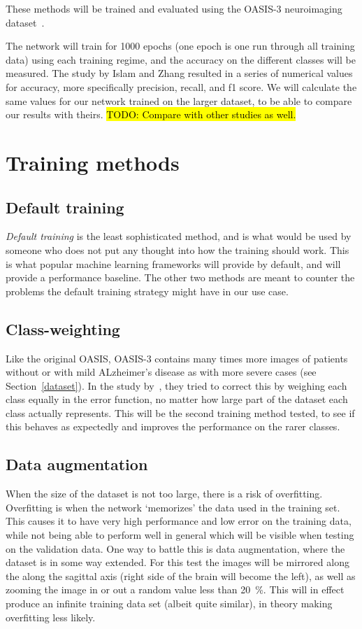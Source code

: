 \documentclass{kththesis}
\newcommand{\num}[1]{{#1}}
\begin{document}
These methods will be trained and evaluated using the OASIS-3 neuroimaging dataset~\cite{oasis}.

The network will train for \num{1000} epochs (one epoch is one run through all training data) using each training regime, and the accuracy on the different classes will be measured. The study by Islam and Zhang resulted in a series of numerical values for accuracy, more specifically precision, recall, and f1 score. We will calculate the same values for our network trained on the larger dataset, to be able to compare our results with theirs. \hl{TODO: Compare with other studies as well.}

\section{Training methods}
\subsection{Default training}
\textit{Default training} is the least sophisticated method, and is what would be used by someone who does not put any thought into how the training should work. This is what popular machine learning frameworks will provide by default, and will provide a performance baseline. The other two methods are meant to counter the problems the default training strategy might have in our use case.

\subsection{Class-weighting}
Like the original OASIS, OASIS-3 contains many times more images of patients without or with mild ALzheimer's disease as with more severe cases (see Section~\ref{dataset}). In the study by~\textcite{islam2017novel}, they tried to correct this by weighing each class equally in the error function, no matter how large part of the dataset each class actually represents. This will be the second training method tested, to see if this behaves as expectedly and improves the performance on the rarer classes.

\subsection{Data augmentation}
When the size of the dataset is not too large, there is a risk of overfitting. Overfitting is when the network `memorizes' the data used in the training set. This causes it to have very high performance and low error on the training data, while not being able to perform well in general which will be visible when testing on the validation data. One way to battle this is data augmentation, where the dataset is in some way extended. For this test the images will be mirrored along the along the sagittal axis (right side of the brain will become the left), as well as zooming the image in or out a random value less than 20~\%. This will in effect produce an infinite training data set (albeit quite similar), in theory making overfitting less likely.
\end{document}
